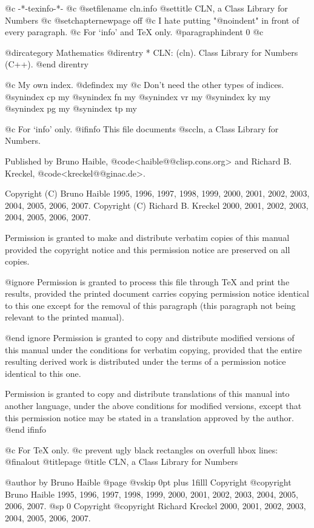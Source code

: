   @c -*-texinfo-*-
@c %
@setfilename cln.info
@settitle CLN, a Class Library for Numbers
@c @setchapternewpage off
@c I hate putting "@noindent" in front of every paragraph.
@c For `info' and TeX only.
@paragraphindent 0
@c %

@dircategory Mathematics
@direntry
* CLN: (cln).                       Class Library for Numbers (C++).
@end direntry

@c My own index.
@defindex my
@c Don't need the other types of indices.
@synindex cp my
@synindex fn my
@synindex vr my
@synindex ky my
@synindex pg my
@synindex tp my


@c For `info' only.
@ifinfo
This file documents @sc{cln}, a Class Library for Numbers.

Published by Bruno Haible, @code{<haible@@clisp.cons.org>} and
Richard B. Kreckel, @code{<kreckel@@ginac.de>}.

Copyright (C)  Bruno Haible 1995, 1996, 1997, 1998, 1999, 2000, 2001, 2002, 2003, 2004, 2005, 2006, 2007.
Copyright (C)  Richard B. Kreckel 2000, 2001, 2002, 2003, 2004, 2005, 2006, 2007.

Permission is granted to make and distribute verbatim copies of
this manual provided the copyright notice and this permission notice
are preserved on all copies.

@ignore
Permission is granted to process this file through TeX and print the
results, provided the printed document carries copying permission
notice identical to this one except for the removal of this paragraph
(this paragraph not being relevant to the printed manual).

@end ignore
Permission is granted to copy and distribute modified versions of this
manual under the conditions for verbatim copying, provided that the entire
resulting derived work is distributed under the terms of a permission
notice identical to this one.

Permission is granted to copy and distribute translations of this manual
into another language, under the above conditions for modified versions,
except that this permission notice may be stated in a translation approved
by the author.
@end ifinfo


@c For TeX only.
@c prevent ugly black rectangles on overfull hbox lines:
@finalout
@titlepage
@title CLN, a Class Library for Numbers

@author by Bruno Haible
@page
@vskip 0pt plus 1filll
Copyright @copyright{} Bruno Haible 1995, 1996, 1997, 1998, 1999, 2000, 2001, 2002, 2003, 2004, 2005, 2006, 2007.
@sp 0
Copyright @copyright{} Richard Kreckel 2000, 2001, 2002, 2003, 2004, 2005, 2006, 2007.

